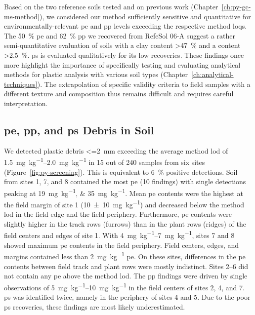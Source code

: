 Based on the two reference soils tested and on previous work (Chapter~\ref{ch:py-gc-ms-method}), we considered our method sufficiently sensitive and quantitative for environmentally-relevant \ac{pe} and \ac{pp} levels exceeding the respective method \acp{loq}. The \SI{50}{\percent} \ac{pe} and \SI{62}{\percent} \ac{pp} we recovered from RefeSol 06-A suggest a rather semi-quantitative evaluation of soils with a clay content \SI{>47}{\percent} and a  content \SI{>2.5}{\percent}. \ac{ps} is evaluated qualitatively for its low recoveries.
These findings once more highlight the importance of specifically testing and evaluating analytical methods for plastic analysis with various soil types (Chapter~\ref{ch:analytical-techniques}). The extrapolation of specific validity criteria to field samples with a different texture and  composition thus remains difficult and requires careful interpretation.

\subsection{\ac{pe}, \ac{pp}, and \ac{ps} Debris in Soil}

We detected plastic debris \SI{<=2}{\milli\meter} exceeding the average method \ac{lod} of \SIrange{1.5}{2.0}{\milli\gram\per\kilo\gram} in 15 out of 240 samples from six sites (Figure~\ref{fig:py-screening}). This is equivalent to \SI{6}{\percent} positive detections. Soil from sites 1, 7, and 8 contained the most \ac{pe} (10 findings) with single detections peaking at \SIlist{19;35}{\milli\gram\per\kilo\gram}. Mean \ac{pe} contents were the highest at the field margin of site 1 (\SI{10(10)}{\milli\gram\per\kilo\gram}) and decreased below the method \ac{lod} in the field edge and the field periphery. Furthermore, \ac{pe} contents were slightly higher in the track rows (furrows) than in the plant rows (ridges) of the field centers and edges of site 1. With \SIrange{4}{7}{\milli\gram\per\kilo\gram}, sites 7 and 8 showed maximum \ac{pe} contents in the field periphery. Field centers, edges, and margins contained less than \SI{2}{\milli\gram\per\kilo\gram} \ac{pe}. On these sites, differences in the \ac{pe} contents between field track and plant rows were mostly indistinct. Sites 2--6 did not contain any \ac{pe} above the method \ac{lod}.
The \ac{pp} findings were driven by single observations of \SIrange{5}{10}{\milli\gram\per\kilo\gram} in the field centers of sites 2, 4, and 7.
\ac{ps} was identified twice, namely in the periphery of sites 4 and 5. Due to the poor \ac{ps} recoveries, these findings are most likely underestimated.

